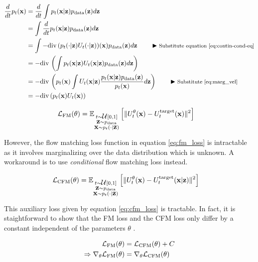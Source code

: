 \documentclass[a4paper, 11pt]{article}
\begin{document}
\begin{align}
    \frac{d}{dt} p_t(\vx) &= \frac{d}{dt} \int p_t(\vx | \vz) p_{\text{data}}(\vz) d\vz \\
    &= \int \frac{d}{dt} p_t(\vx | \vz) p_{\text{data}}(\vz) d\vz \\
    &= \int - \diver (p_t(\cdot |\vz) U_t(\cdot |\vz))(\vx)  p_{\text{data}}(\vz) d\vz \eqcomment{Substitute equation \eqref{eq:contin-cond-eq}}\\
    &= - \diver \left ( \int p_t(\vx |\vz)U_t(\vx |\vz)  p_{\text{data}}(\vz) d\vz \right ) \\
    &= - \diver \left ( p_t(\vx) \int U_t(\vx |\vz) \frac{p_t(\vx |\vz)  p_{\text{data}}(\vz)}{p_t(\vx)} d\vz \right ) \eqcomment{Substitute \eqref{eq:marg_vel}}\\
    &= - \diver( p_t(\vx)U_t(\vx))
\end{align}



\begin{align}
    \fL_{\text{FM}}(\theta) &= \E_{\substack{t \sim \fU[0, 1] \\ 
    \vz \sim p_{\text{data}} \\
    \vx \sim p_t(\cdot | \vz)}} \left [ \|U_t^{\theta}(\vx) - U_t^{\text{target}}(\vx) \|^2 \right ] \label{eq:fm_loss}
\end{align}

However, the flow matching loss function in equation \eqref{eq:fm_loss} is intractable as it involves marginalizing over the data distribution which is unknown. A workaround is to use \textit{conditional} flow matching loss instead.

\begin{align}
    \fL_{\text{CFM}}(\theta) &= \E_{\substack{t \sim \fU[0, 1] \\ 
    \vz \sim p_{\text{data}} \\
    \vx \sim p_t(\cdot | \vz)}} \left [ \|U_t^{\theta}(\vx) - U_t^{\text{target}}(\vx | \vz) \|^2 \right ]\label{eq:cfm_loss}
\end{align}

This auxiliary loss given by equation \eqref{eq:cfm_loss} is tractable. In fact, it is staightforward to show that  the FM loss and the CFM loss only differ by a constant independent of the parameters $\theta$ \citep{holderrieth2025generatormatchinggenerativemodeling}.

\begin{align}
    \fL_{\text{FM}}(\theta) &= \fL_{\text{CFM}}(\theta) + C \\
    \Rightarrow \nabla_{\theta} \fL_{\text{FM}}(\theta) &= \nabla_{\theta}\fL_{\text{CFM}}(\theta)
\end{align}
\end{document}
